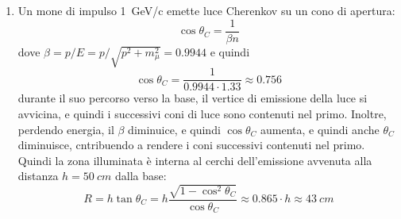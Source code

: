 \begin{Answer}
\begin{enumerate}
  \item Un mone di impulso \SI{1}{GeV/c} emette luce Cherenkov su un cono di apertura:
    \[
    \cos\theta_C = \frac{1}{\beta n}
    \]
    dove $\beta = p/E = p/\sqrt{p^2+m_\mu^2}=0.9944$ e quindi 
    \[
    \cos\theta_C = \frac{1}{0.9944\cdot 1.33} \approx 0.756
    \]
    durante il suo percorso verso la base, il vertice di emissione
    della luce si avvicina, e quindi i successivi coni di luce sono
    contenuti nel primo. Inoltre, perdendo energia, il $\beta$
    diminuice, e quindi $\cos\theta_C$ aumenta, e quindi anche
    $\theta_C$ diminuisce, cntribuendo a rendere i coni successivi
    contenuti nel primo.  Quindi la zona illuminata \`e interna al
    cerchi dell'emissione avvenuta alla distanza $h=\SI{50}{cm}$ dalla
    base:
    \[
    R = h \tan\theta_C = h \frac{\sqrt{1-\cos^2\theta_C}}{\cos\theta_C} \approx 0.865 \cdot h \approx \SI{43}{cm}
    \]
  \end{enumerate}
\end{Answer}

